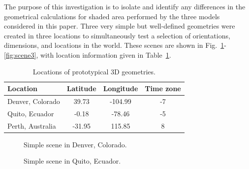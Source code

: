 \documentclass[twocolumn,10pt]{asme2ej}
\begin{document}
The purpose of this investigation is to isolate and identify any differences in the geometrical calculations for shaded area performed by the three models considered in this paper.  Three very simple but well-defined geometries were created in three locations to simultaneously test a selection of orientations, dimensions, and locations in the world.  These scenes are shown in Fig.~\ref{fig:scene1}-\ref{fig:scene3}, with location information given in Table~\ref{tab:locations}.

\begin{table}[h!]
\begin{center}
\begin{tabular}{lccc}
Location & Latitude & Longitude & Time zone \\
\hline
Denver, Colorado & 39.73 & -104.99 & -7 \\
Quito, Ecuador & -0.18 & -78.46 & -5 \\
Perth, Australia & -31.95 & 115.85 & 8 \\
\end{tabular}
\caption{Locations of prototypical 3D geometries.}
\label{tab:locations}
\end{center}
\end{table}


\begin{figure}[h!]
\begin{center}
\end{center}
\caption{Simple scene in Denver, Colorado.}
\label{fig:scene1}
\end{figure}

\begin{figure}[h!]
\begin{center}
\end{center}
\caption{Simple scene in Quito, Ecuador.}
\label{fig:scene2}
\end{figure}
\end{document}
